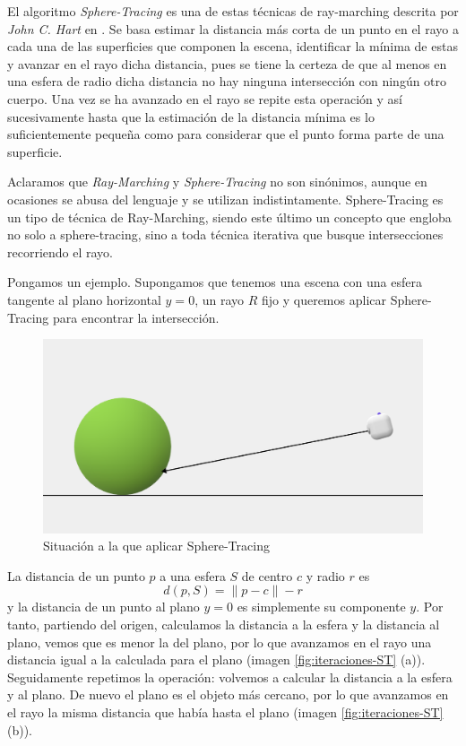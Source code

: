 El algoritmo \textit{Sphere-Tracing} es una de estas técnicas de ray-marching descrita por \textit{John C. Hart} en \cite{Hart-1995}. Se basa estimar la distancia más corta de un punto en el rayo a cada una de las superficies que componen la escena, identificar la mínima de estas y avanzar en el rayo dicha distancia, pues se tiene la certeza de que al menos en una esfera de radio dicha distancia no hay ninguna intersección con ningún otro cuerpo. Una vez se ha avanzado en el rayo se repite esta operación y así sucesivamente hasta que la estimación de la distancia mínima es lo suficientemente pequeña como para considerar que el punto forma parte de una superficie.

Aclaramos que \textit{Ray-Marching} y \textit{Sphere-Tracing} no son sinónimos, aunque en ocasiones se abusa del lenguaje y se utilizan indistintamente. Sphere-Tracing es un tipo de técnica de Ray-Marching, siendo este último un concepto que engloba no solo a sphere-tracing, sino a toda técnica iterativa que busque intersecciones recorriendo el rayo.

Pongamos un ejemplo. Supongamos que tenemos una escena con una esfera tangente al plano horizontal $y=0$, un rayo $R$ fijo y queremos aplicar Sphere-Tracing para encontrar la intersección.

\begin{figure} [ht]
    \centering
    \includegraphics[scale = 0.2]{img/C8/situacion-inicial.png}
    \caption{Situación a la que aplicar Sphere-Tracing}
    \label{fig:ST-inicial}
\end{figure}

La distancia de un punto $p$ a una esfera $S$ de centro $c$ y radio $r$ es 
\begin{equation}
    \label{eq:distancia-punto-esfera}
    d(p,S) = \|p-c\| - r 
\end{equation}
y la distancia de un punto al plano $y=0$ es simplemente su componente $y$. Por tanto, partiendo del origen, calculamos la distancia a la esfera y la distancia al plano, vemos que es menor la del plano, por lo que avanzamos en el rayo una distancia igual a la calculada para el plano (imagen \ref{fig:iteraciones-ST} (a)). Seguidamente repetimos la operación: volvemos a calcular la distancia a la esfera y al plano. De nuevo el plano es el objeto más cercano, por lo que avanzamos en el rayo la misma distancia que había hasta el plano (imagen \ref{fig:iteraciones-ST} (b)).

